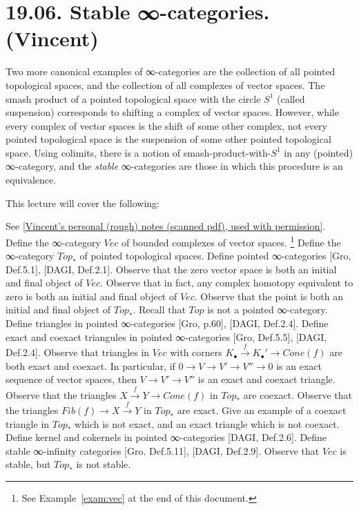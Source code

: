 \documentclass[a4paper]{amsart}
\numberwithin{figure}{section}
\theoremstyle{theorem}
\theoremstyle{definition}
\newcommand{\Top}{{Top}}
\newcommand{\pTop}{{Top}_\ast}
\newcommand{\grVec}{{Vec}}
\begin{document}

\section{19.06. Stable ∞-categories. (Vincent)} \label{stable}

Two more canonical examples of ∞-categories are the collection of all pointed topological spaces, and the collection of all complexes of vector spaces. The smash product of a pointed topological space with the circle $S^1$ (called suspension) corresponds to shifting a complex of vector spaces. %
However, while every complex of vector spaces is the shift of some other complex, not every pointed topological space is the suspension of some other pointed topological space. Using colimits, there is a notion of smash-product-with-$S^1$ in any (pointed) ∞-category, and the \emph{stable} ∞-categories are those in which this procedure is an equivalence.

This lecture will cover the following:

See \href{InfCat7St.pdf}{[Vincent's personal (rough) notes (scanned pdf), used with permission]}. \\%

Define the ∞-category $\grVec$ of bounded complexes of vector spaces.%
\footnote{%
See Example~\ref{exam:vec} at the end of this document.
} %
Define the ∞-category $\pTop$ of pointed topological spaces. %
Define pointed ∞-categories [Gro, Def.5.1], [DAGI, Def.2.1]. %
Observe that the zero vector space is both an initial and final object of $\grVec$. %
Observe that in fact, any complex homotopy equivalent to zero is both an initial and final object of $\grVec$. %
Observe that the point is both an initial and final object of $\pTop$. %
Recall that $\Top$ is not a pointed ∞-category. %
Define triangles in pointed ∞-categories [Gro, p.60], [DAGI, Def.2.4]. %
Define exact and coexact triangules in pointed ∞-categories [Gro, Def.5.5], [DAGI, Def.2.4]. %
Observe that  triangles in $\grVec$ with corners $K_\bullet \stackrel{f}{\to} K_\bullet' \to Cone(f)$ are both exact and coexact. %
In particular, if $0 \to V \to V' \to V'' \to 0$ is an exact sequence of vector spaces, then $V \to V' \to V''$ is an exact and coexact triangle. %
Observe that the triangles $X \stackrel{f}{\to} Y \to Cone(f)$ in $\pTop$ are coexact. %
Observe that the triangles $Fib(f) \to X \stackrel{f}{\to} Y$ in $\pTop$ are exact. %
Give an example of a coexact triangle in $\pTop$ which is not exact, and an exact triangle which is not coexact. %
Define kernel and cokernels in pointed ∞-categories [DAGI, Def.2.6]. %
Define stable ∞-infinity categories [Gro. Def.5.11], [DAGI, Def.2.9]. %
Observe that $\grVec$ is stable, but $\pTop$ is not stable. %
\end{document}
